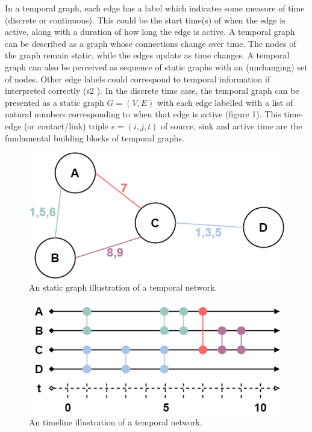 \begin{introduction}
In a temporal graph, each edge has a label which indicates some measure of time (discrete or continuous). This could be the start time(s) of when the edge is active, along with a duration of how long the edge is active. A temporal graph can be described as a graph whose connections change over time. The nodes of the graph remain static, while the edges update as time changes. A temporal graph can also be perceived as sequence of static graphs with an (unchanging) set of nodes. Other edge labels could correspond to temporal information if interpreted correctly (s2 \cite{intro_temporal}).
In the discrete time case, the temporal graph can be presented as a static graph $G=(V, E)$ with each edge labelled with a list of natural numbers corresponding to when that edge is active (figure 1). This time-edge (or contact/link) triple $e = (i, j, t)$ of source, sink and active time are the fundamental building blocks of temporal graphs.\\
\begin{figure}
    \centering
    \includegraphics[scale=0.6]{images/temporal_graph_a.png}
    \caption{An static graph illustration of a temporal network.}
\end{figure}
\begin{figure}
    \centering
    \includegraphics[scale=0.6]{images/temporal_graph_b.png}
    \caption{An timeline illustration of a temporal network.}

\end{figure}
\end{introduction}
